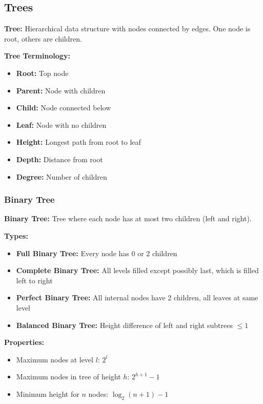 \documentclass[11pt,a4paper]{article}
\begin{document}
\subsection{Trees}

\begin{defbox}
\textbf{Tree:} Hierarchical data structure with nodes connected by edges. One node is root, others are children.
\end{defbox}

\textbf{Tree Terminology:}
\begin{itemize}
    \item \textbf{Root:} Top node
    \item \textbf{Parent:} Node with children
    \item \textbf{Child:} Node connected below
    \item \textbf{Leaf:} Node with no children
    \item \textbf{Height:} Longest path from root to leaf
    \item \textbf{Depth:} Distance from root
    \item \textbf{Degree:} Number of children
\end{itemize}

\subsubsection{Binary Tree}

\begin{defbox}
\textbf{Binary Tree:} Tree where each node has at most two children (left and right).
\end{defbox}

\textbf{Types:}
\begin{itemize}
    \item \textbf{Full Binary Tree:} Every node has 0 or 2 children
    \item \textbf{Complete Binary Tree:} All levels filled except possibly last, which is filled left to right
    \item \textbf{Perfect Binary Tree:} All internal nodes have 2 children, all leaves at same level
    \item \textbf{Balanced Binary Tree:} Height difference of left and right subtrees $\leq 1$
\end{itemize}

\textbf{Properties:}
\begin{itemize}
    \item Maximum nodes at level $l$: $2^l$
    \item Maximum nodes in tree of height $h$: $2^{h+1} - 1$
    \item Minimum height for $n$ nodes: $\log_2(n+1) - 1$
\end{itemize}
\end{document}
